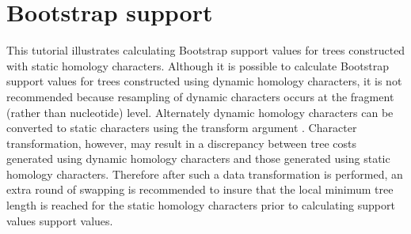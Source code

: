 
\section{Bootstrap support}{\label{tutorial6}}

This tutorial illustrates calculating Bootstrap support values for trees constructed with static homology characters.  
Although it is possible to calculate Bootstrap support values for trees constructed using dynamic homology 
characters, it is not recommended because resampling of 
dynamic characters occurs at the fragment (rather than nucleotide) level. Alternately dynamic homology 
characters can be converted to static characters using the transform argument .  
Character transformation, however, may result in a discrepancy between tree costs generated using dynamic 
homology characters and those generated using static homology characters. Therefore after such a data 
transformation is performed, an extra round of swapping is recommended to insure that the local minimum tree 
length is reached for the static homology characters prior to calculating support values  support values.

